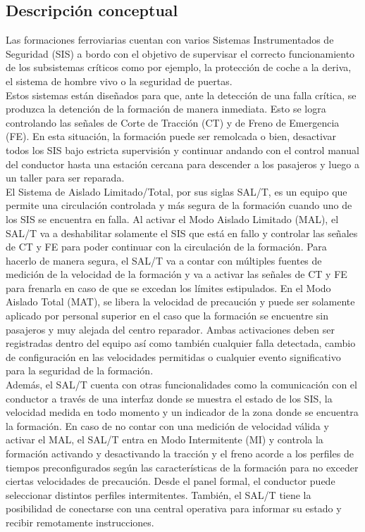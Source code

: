 

\subsection{Descripción conceptual}

Las formaciones ferroviarias cuentan con varios Sistemas Instrumentados de Seguridad (SIS) a bordo con el objetivo de supervisar el correcto funcionamiento de los subsistemas críticos como por ejemplo, la protección de coche a la deriva, el sistema de hombre vivo o la seguridad de puertas. \\

Estos sistemas están diseñados para que, ante la detección de una falla crítica, se produzca la detención de la formación de manera inmediata. Esto se logra controlando las señales de Corte de Tracción (CT) y de Freno de Emergencia (FE). En esta situación, la formación puede ser remolcada o bien, desactivar todos los SIS bajo estricta supervisión y continuar andando con el control manual del conductor hasta una estación cercana para descender a los pasajeros y luego a un taller para ser reparada. \\

El Sistema de Aislado Limitado/Total, por sus siglas SAL/T, es un equipo que permite una circulación controlada y más segura de la formación cuando uno de los SIS se encuentra en falla. Al activar el Modo Aislado Limitado (MAL), el SAL/T va a deshabilitar solamente el SIS que está en fallo y controlar las señales de CT y FE para poder continuar con la circulación de la formación. Para hacerlo de manera segura, el SAL/T va a contar con múltiples fuentes de medición de la velocidad de la formación y va a activar las señales de CT y FE para frenarla en caso de que se excedan los límites estipulados. En el Modo Aislado Total (MAT), se libera la velocidad de precaución y puede ser solamente aplicado por personal superior en el caso que la formación se encuentre sin pasajeros y muy alejada del centro reparador. Ambas activaciones deben ser registradas dentro del equipo así como también cualquier falla detectada, cambio de configuración en las velocidades permitidas o cualquier evento significativo para la seguridad de la formación.\\

Además, el SAL/T cuenta con otras funcionalidades como la comunicación con el conductor a través de una interfaz donde se muestra el estado de los SIS, la velocidad medida en todo momento y un indicador de la zona donde se encuentra la formación. En caso de no contar con una medición de velocidad válida y activar el MAL, el SAL/T entra en Modo Intermitente (MI) y controla la formación activando y desactivando la tracción y el freno acorde a los perfiles de tiempos preconfigurados según las características de la formación para no exceder ciertas velocidades de precaución. Desde el panel formal, el conductor puede seleccionar distintos perfiles intermitentes.  También, el SAL/T tiene la posibilidad de conectarse con una central operativa para informar su estado y recibir remotamente instrucciones. \\

